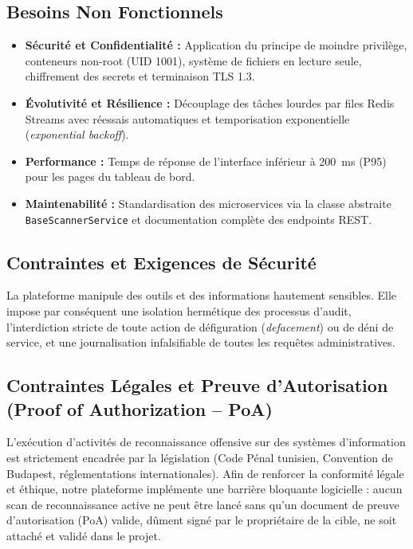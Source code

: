 \subsection{Besoins Non Fonctionnels}
\begin{itemize}
    \item \textbf{S\'ecurit\'e et Confidentialit\'e :} Application du principe de moindre privil\`ege, conteneurs non-root (UID 1001), syst\`eme de fichiers en lecture seule, chiffrement des secrets et terminaison TLS 1.3.
    \item \textbf{\'Evolutivit\'e et R\'esilience :} D\'ecouplage des t\^aches lourdes par files Redis Streams avec r\'eessais automatiques et temporisation exponentielle (\textit{exponential backoff}).
    \item \textbf{Performance :} Temps de r\'eponse de l'interface inf\'erieur \`a 200~ms (P95) pour les pages du tableau de bord.
    \item \textbf{Maintenabilit\'e :} Standardisation des microservices via la classe abstraite \texttt{BaseScannerService} et documentation compl\`ete des endpoints REST.
\end{itemize}

\subsection{Contraintes et Exigences de S\'ecurit\'e}
\par La plateforme manipule des outils et des informations hautement sensibles. Elle impose par cons\'equent une isolation herm\'etique des processus d'audit, l'interdiction stricte de toute action de d\'efiguration (\textit{defacement}) ou de d\'eni de service, et une journalisation infalsifiable de toutes les requ\^etes administratives.

\subsection{Contraintes L\'egales et Preuve d'Autorisation (Proof of Authorization -- PoA)}
\par L'ex\'ecution d'activit\'es de reconnaissance offensive sur des syst\`emes d'information est strictement encadr\'ee par la l\'egislation (Code P\'enal tunisien, Convention de Budapest, r\'eglementations internationales). Afin de renforcer la conformit\'e l\'egale et \'ethique, notre plateforme impl\'emente une barri\`ere bloquante logicielle : aucun scan de reconnaissance active ne peut \^etre lanc\'e sans qu'un document de preuve d'autorisation (PoA) valide, d\^ument sign\'e par le propri\'etaire de la cible, ne soit attach\'e et valid\'e dans le projet.


